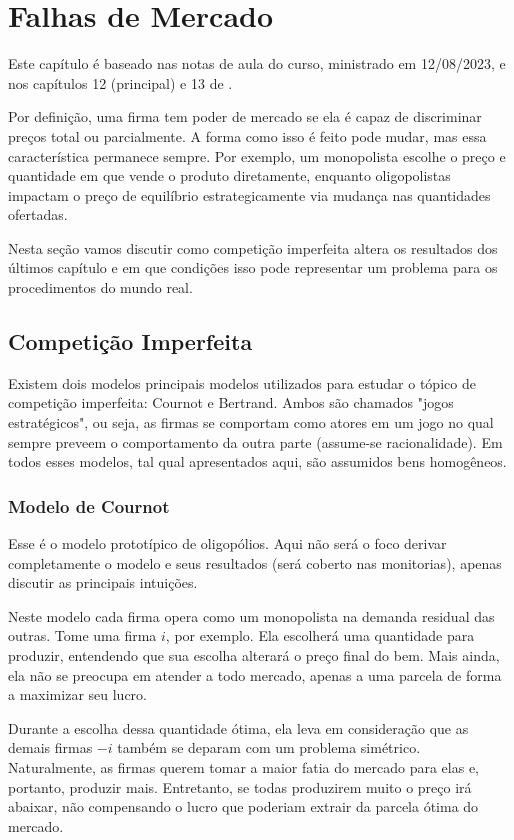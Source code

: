 \chapter{Falhas de Mercado}
\localtableofcontents 

Este capítulo é baseado nas notas de aula do curso, ministrado em 12/08/2023, e nos capítulos 12 (principal) e 13 de \textcite{cretì_fontini_2019}.

Por definição, uma firma tem poder de mercado se ela é capaz de discriminar preços total ou parcialmente. A forma como isso é feito pode mudar, mas essa característica permanece sempre. Por exemplo, um monopolista escolhe o preço e quantidade em que vende o produto diretamente, enquanto oligopolistas impactam o preço de equilíbrio estrategicamente via mudança nas quantidades ofertadas.

Nesta seção vamos discutir como competição imperfeita altera os resultados dos últimos capítulo e em que condições isso pode representar um problema para os procedimentos do mundo real.

\section{Competição Imperfeita}
Existem dois modelos principais modelos utilizados para estudar o tópico de competição imperfeita: Cournot e Bertrand. Ambos são chamados "jogos estratégicos", ou seja, as firmas se comportam como atores em um jogo no qual sempre preveem o comportamento da outra parte (assume-se racionalidade). Em todos esses modelos, tal qual apresentados aqui, são assumidos bens homogêneos.

\subsection{Modelo de Cournot}
Esse é o modelo prototípico de oligopólios. Aqui não será o foco derivar completamente o modelo e seus resultados (será coberto nas monitorias), apenas discutir as principais intuições.

Neste modelo cada firma opera como um monopolista na demanda residual das outras. Tome uma firma $i$, por exemplo. Ela escolherá uma quantidade para produzir, entendendo que sua escolha alterará o preço final do bem. Mais ainda, ela não se preocupa em atender a todo mercado, apenas a uma parcela de forma a maximizar seu lucro. 

Durante a escolha dessa quantidade ótima, ela leva em consideração que as demais firmas $-i$ também se deparam com um problema simétrico. Naturalmente, as firmas querem tomar a maior fatia do mercado para elas e, portanto, produzir mais. Entretanto, se todas produzirem muito o preço irá abaixar, não compensando o lucro que poderiam extrair da parcela ótima do mercado.


